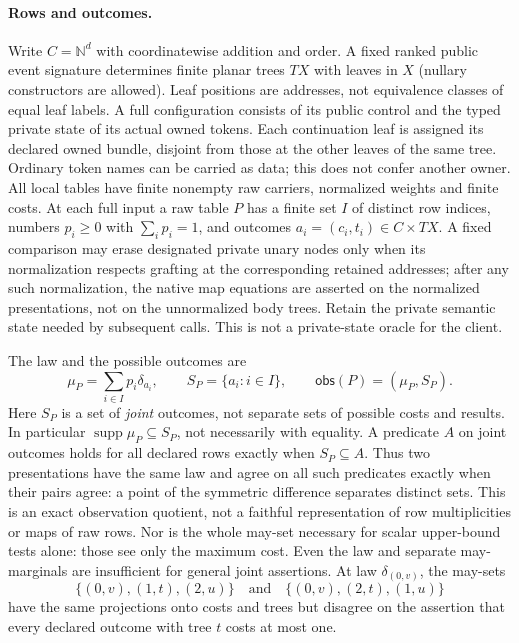 \documentclass[11pt]{article}
\theoremstyle{definition}
\newcommand{\obs}{\mathsf{obs}}
\begin{document}
\paragraph{Rows and outcomes.}
Write $C=\mathbb N^d$ with coordinatewise addition and order. A fixed
ranked public event signature determines finite planar trees $TX$ with
leaves in $X$ (nullary constructors are allowed). Leaf positions are
addresses, not equivalence classes of equal leaf labels. A full
configuration consists of its public control and the typed private state
of its actual owned tokens. Each continuation leaf is assigned its
declared owned bundle, disjoint from those at the other leaves of the
same tree. Ordinary token names can be carried as data; this does not
confer another owner. All local tables have finite nonempty raw carriers,
normalized weights and finite costs. At each full input a raw table $P$
has a finite set $I$ of distinct row indices, numbers $p_i\geq0$ with
$\sum_i p_i=1$, and outcomes $a_i=(c_i,t_i)\in C\times TX$. A fixed
comparison may erase designated private unary nodes only when its
normalization respects grafting at the corresponding retained addresses;
after any such normalization, the native map equations are asserted on
the normalized presentations, not on the unnormalized body trees.
Retain the private semantic
state needed by subsequent calls. This is not a private-state oracle
for the client.

The law and the possible outcomes are
\[
 \mu_P=\sum_{i\in I}p_i\delta_{a_i},\qquad S_P=\{a_i:i\in I\},
 \qquad \obs(P)=(\mu_P,S_P).
\]
Here $S_P$ is a set of \emph{joint} outcomes, not separate sets of
possible costs and results. In particular $\operatorname{supp}\mu_P
\subseteq S_P$, not necessarily with equality. A predicate $A$ on
joint outcomes holds for all declared rows exactly when $S_P\subseteq A$.
Thus two presentations have the same law and agree on all such predicates
exactly when their pairs agree: a point of the symmetric difference
separates distinct sets. This is an exact observation quotient, not a
faithful representation of row multiplicities or maps of raw rows.
Nor is the whole may-set necessary for scalar upper-bound tests alone:
those see only the maximum cost. Even the law and separate may-marginals
are insufficient for general joint assertions. At law $\delta_{(0,v)}$,
the may-sets
\[
 \{(0,v),(1,t),(2,u)\} \quad\text{and}\quad \{(0,v),(2,t),(1,u)\}
\]
have the same projections onto costs and trees but disagree on the
assertion that every declared outcome with tree $t$ costs at most one.
\end{document}
